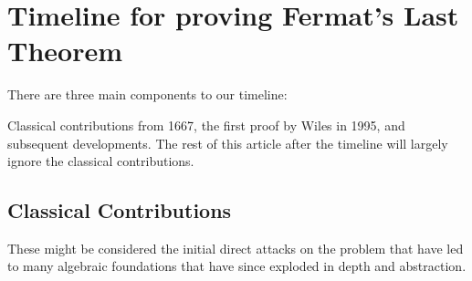 \documentclass{article}
\theoremstyle{definition}
\theoremstyle{definition}
\theoremstyle{definition}
\begin{document}
\section{Timeline for proving Fermat's Last Theorem}

There are three main components to our timeline:

Classical contributions from 1667, the first proof by Wiles in 1995, and subsequent developments. The rest of this article after the timeline will largely ignore the classical contributions.

 
\subsection{Classical Contributions}

These might be considered the initial direct attacks on the problem that have led to many algebraic foundations that have since exploded in depth and abstraction.
\end{document}
